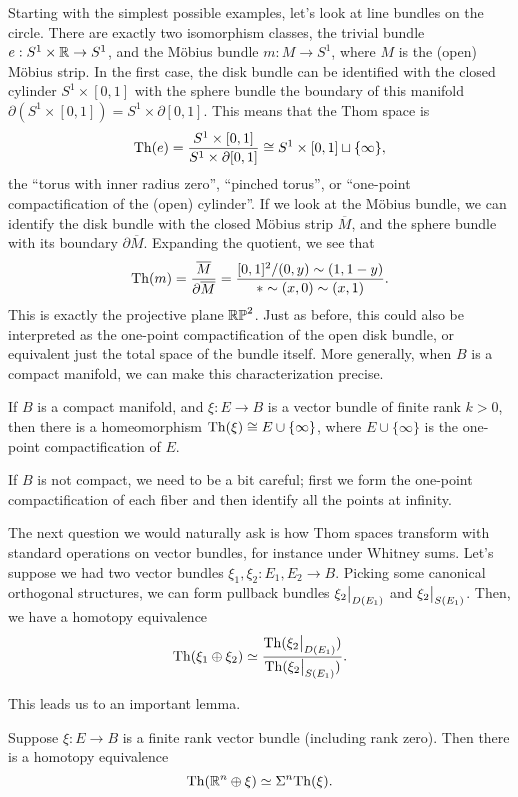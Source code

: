 \documentclass{article}
\begin{document}
Starting with the simplest possible examples, let's look at line bundles on the circle. There are exactly two isomorphism classes, the trivial bundle $e : S^1\times \mathbb{R} \to S^1$, and the M\"obius bundle $m : M \to S^1$, where $M$ is the (open) M\"obius strip. In the first case, the disk bundle can be identified with the closed cylinder $S^1\times [0,1]$ with the sphere bundle the boundary of this manifold $\partial (S^1\times [0,1]) = S^1\times \partial [0,1]$. This means that the Thom space is
\[\mathrm{Th}(e) = \frac{S^1\times [0,1]}{S^1\times \partial [0,1]} \cong S^1\times [0,1]\sqcup \{\infty\},\]
the ``torus with inner radius zero'', ``pinched torus'', or ``one-point compactification of the (open) cylinder''. If we look at the M\"obius bundle, we can identify the disk bundle with the closed M\"obius strip $\overline{M}$, and the sphere bundle with its boundary $\partial\overline{M}$. Expanding the quotient, we see that
\[
  \mathrm{Th}(m) = \frac{\overline{M}}{\partial\overline{M}}=\frac{[0,1]^2 / (0,y)\sim (1, 1-y)}{*\sim (x, 0) \sim (x, 1)}.
\]
This is exactly the projective plane $\mathbb{RP}^2$. Just as before, this could also be interpreted as the one-point compactification of the open disk bundle, or equivalent just the total space of the bundle itself. More generally, when $B$ is a compact manifold, we can make this characterization precise.

\begin{proposition}
  If $B$ is a compact manifold, and $\xi : E \to B$ is a vector bundle of finite rank $k>0$, then there is a homeomorphism $\mathrm{Th}(\xi) \cong E\cup\{\infty\}$, where $E\cup\{\infty\}$ is the one-point compactification of $E$.
\end{proposition}

If $B$ is not compact, we need to be a bit careful; first we form the one-point compactification of each fiber and then identify all the points at infinity.

The next question we would naturally ask is how Thom spaces transform with standard operations on vector bundles, for instance under Whitney sums. Let's suppose we had two vector bundles $\xi_1, \xi_2 : E_1, E_2 \to B$. Picking some canonical orthogonal structures, we can form pullback bundles $\restr{\xi_2}{D(E_1)}$ and $\restr{\xi_2}{S(E_1)}$. Then, we have a homotopy equivalence 
\[
  \Th(\xi_1\oplus \xi_2) \simeq \frac{\Th(\restr{\xi_2}{D(E_1)})}{\Th(\restr{\xi_2}{S(E_1)})}.
\]

This leads us to an important lemma.

\begin{lemma}
  Suppose $\xi : E \to B$ is a finite rank vector bundle (including rank zero). Then there is a homotopy equivalence
  \[
    \mathrm{Th}(\mathbb{R}^n\oplus \xi) \simeq \Sigma^n \mathrm{Th}(\xi).
  \]
\end{lemma}
\end{document}
